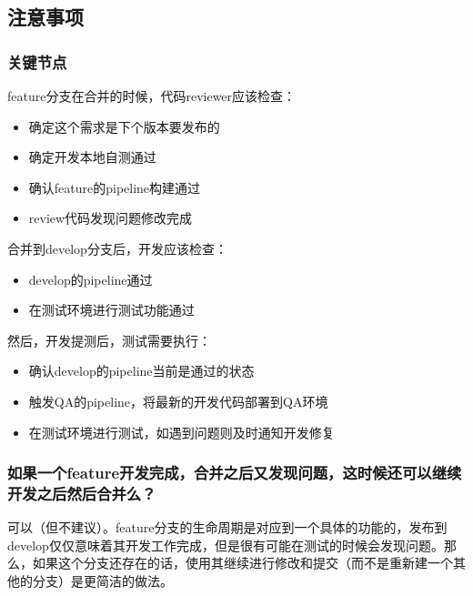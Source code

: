 \documentclass[12pt]{article}
\begin{document}
\subsection{注意事项}\label{ux6ce8ux610fux4e8bux9879}

\subsubsection{关键节点}\label{ux5173ux952eux8282ux70b9}

feature分支在合并的时候，代码reviewer应该检查：

\begin{itemize}
\tightlist
\item
  确定这个需求是下个版本要发布的
\item
  确定开发本地自测通过
\item
  确认feature的pipeline构建通过
\item
  review代码发现问题修改完成
\end{itemize}

合并到develop分支后，开发应该检查：

\begin{itemize}
\tightlist
\item
  develop的pipeline通过
\item
  在测试环境进行测试功能通过
\end{itemize}

然后，开发提测后，测试需要执行：

\begin{itemize}
\tightlist
\item
  确认develop的pipeline当前是通过的状态
\item
  触发QA的pipeline，将最新的开发代码部署到QA环境
\item
  在测试环境进行测试，如遇到问题则及时通知开发修复
\end{itemize}

\subsubsection{如果一个feature开发完成，合并之后又发现问题，这时候还可以继续开发之后然后合并么？}\label{ux5982ux679cux4e00ux4e2afeatureux5f00ux53d1ux5b8cux6210ux5408ux5e76ux4e4bux540eux53c8ux53d1ux73b0ux95eeux9898ux8fd9ux65f6ux5019ux8fd8ux53efux4ee5ux7ee7ux7eedux5f00ux53d1ux4e4bux540eux7136ux540eux5408ux5e76ux4e48}

可以（但不建议）。feature分支的生命周期是对应到一个具体的功能的，发布到develop仅仅意味着其开发工作完成，但是很有可能在测试的时候会发现问题。那么，如果这个分支还存在的话，使用其继续进行修改和提交（而不是重新建一个其他的分支）是更简洁的做法。
\end{document}
